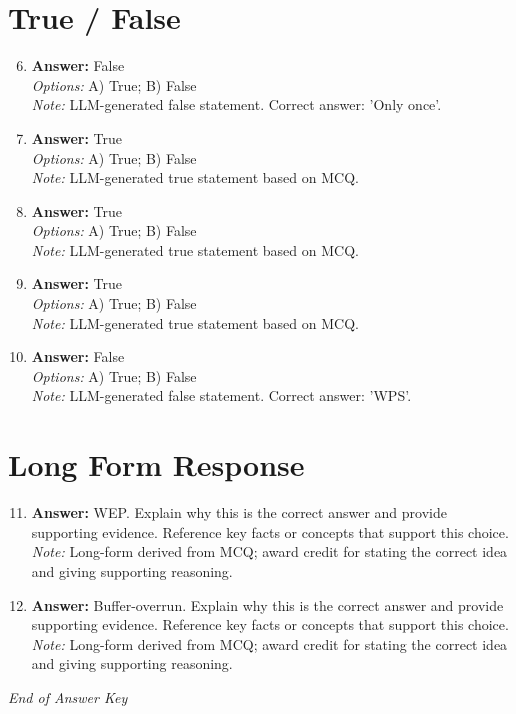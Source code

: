 \documentclass[12pt]{article}
\begin{document}
\section*{True / False}
\begin{enumerate}[label=\arabic*.]
\setcounter{enumi}{5}
\item \textbf{Answer:} False
\\ \textit{Options:} A) True; B) False
\\ \textit{Note:} LLM-generated false statement. Correct answer: 'Only once'.
\item \textbf{Answer:} True
\\ \textit{Options:} A) True; B) False
\\ \textit{Note:} LLM-generated true statement based on MCQ.
\item \textbf{Answer:} True
\\ \textit{Options:} A) True; B) False
\\ \textit{Note:} LLM-generated true statement based on MCQ.
\item \textbf{Answer:} True
\\ \textit{Options:} A) True; B) False
\\ \textit{Note:} LLM-generated true statement based on MCQ.
\item \textbf{Answer:} False
\\ \textit{Options:} A) True; B) False
\\ \textit{Note:} LLM-generated false statement. Correct answer: 'WPS'.
\end{enumerate}

\section*{Long Form Response}
\begin{enumerate}[label=\arabic*.]
\setcounter{enumi}{10}
\item \textbf{Answer:} WEP. Explain why this is the correct answer and provide supporting evidence. Reference key facts or concepts that support this choice.
\\ \textit{Note:} Long-form derived from MCQ; award credit for stating the correct idea and giving supporting reasoning.
\item \textbf{Answer:} Buffer-overrun. Explain why this is the correct answer and provide supporting evidence. Reference key facts or concepts that support this choice.
\\ \textit{Note:} Long-form derived from MCQ; award credit for stating the correct idea and giving supporting reasoning.
\end{enumerate}

\vfill
\noindent\textit{End of Answer Key}
\end{document}
